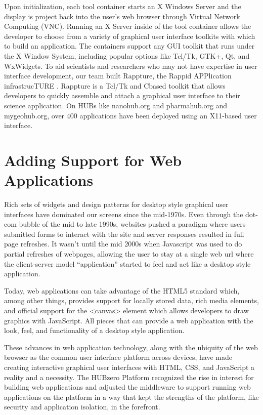 \documentclass[conference]{../sty/IEEEtran}
\newcommand\CC{C\nolinebreak[4]\hspace{-.05em}\raisebox{.4ex}{\relsize{-3}{\textbf{++}}}\hspace{.25em}}
\begin{document}
Upon initialization, each tool container starts an X Windows Server and the
display is project back into the user's web browser through Virtual Network
Computing (VNC).  Running an X Server inside of the tool container allows the
developer to choose from a variety of graphical user interface toolkits with
which to build an application. The containers support any GUI toolkit that runs
under the X Window System, including popular options like Tcl/Tk, GTK+, Qt, and
WxWidgets.  To aid scientists and researchers who may not have expertise in
user interface development, our team built Rappture, the Rappid APPlication
infrastrucTURE \cite{rappture}.  Rappture is a Tcl/Tk and \CC based toolkit
that allows developers to quickly assemble and attach a graphical user
interface to their science application. On HUBs like nanohub.org and
pharmahub.org and mygeohub.org, over 400 applications have been deployed using
an X11-based user interface.



\section {Adding Support for Web Applications}

Rich sets of widgets and design patterns for desktop style graphical user
interfaces have dominated our screens since the mid-1970s. Even through the
dot-com bubble of the mid to late 1990s, websites pushed a paradigm where users
submitted forms to interact with the site and server responses resulted in full
page refreshes. It wasn't until the mid 2000s when Javascript was used to do
partial refreshes of webpages, allowing the user to stay at a single web url
where the client-server model ``application'' started to feel and act like a
desktop style application.

Today, web applications can take advantage of the HTML5 standard which, among
other things, provides support for locally stored data, rich media elements,
and official support for the <canvas> element which allows developers to draw
graphics with JavaScript. All pieces that can provide a web application with
the look, feel, and functionality of a desktop style application.

These advances in web application technology, along with the ubiquity of the
web browser as the common user interface platform across devices, have made
creating interactive graphical user interfaces with HTML, CSS, and JavaScript a
reality and a necessity. The HUBzero Platform recognized the rise in interest
for building web applications and adjusted the middleware to support running
web applications on the platform in a way that kept the strengths of the
platform, like security and application isolation, in the forefront.
\end{document}

